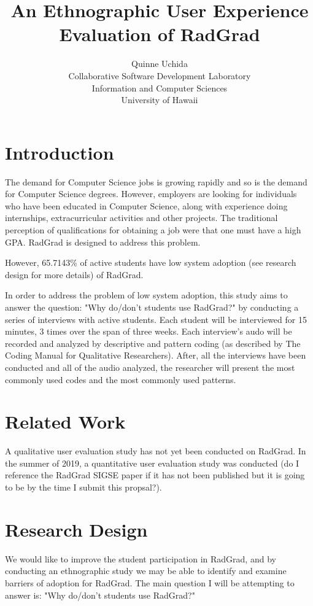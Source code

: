 \documentclass[english]{proposalnsf}
\title{An Ethnographic User Experience Evaluation of RadGrad}
\author{Quinne Uchida \\Collaborative Software Development Laboratory \\ Information and Computer Sciences \\ University of Hawaii}
\begin{document}
\maketitle
\tableofcontents
\newpage

\section{Introduction}
\label{introduction}

The demand for Computer Science jobs is growing rapidly and so is the demand for Computer Science degrees. However, employers are looking for individuals who have been educated in Computer Science, along with experience doing internships, extracurricular activities and other projects. The traditional perception of qualifications for obtaining a job were that one must have a high GPA. RadGrad is designed to address this problem. 

However, 65.7143{\%} of active students have low system adoption (see research design for more details) of RadGrad. 

In order to address the problem of low system adoption, this study aims to answer the question: "Why do/don't students use RadGrad?" by conducting a series of interviews with active students. 
Each student will be interviewed for 15 minutes, 3 times over the span of three weeks. Each interview's audo will be recorded and analyzed by descriptive and pattern coding (as described by The Coding Manual for Qualitative Researchers). 
After, all the interviews have been conducted and all of the audio analyzed, the researcher will present the most commonly used codes and the most commonly used patterns. 


\section{Related Work}
\label{related-work}

A qualitative user evaluation study has not yet been conducted on RadGrad. In the summer of 2019, a quantitative user evaluation study was conducted (do I reference the RadGrad SIGSE paper if it has not been published but it is going to be by the time I submit this propsal?). 

\section{Research Design}
\label{research-design}

We would like to improve the student participation in RadGrad, and by conducting an ethnographic study we may be able to identify and examine barriers of adoption for RadGrad. The main question I will be attempting to answer is: "Why do/don't students use RadGrad?"
\end{document}
